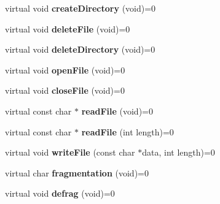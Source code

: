\begin{DoxyCompactItemize}
\mbox{\label{classcore_1_1_i_file_system_a2afdee3dd280f84415d6d0e8cf3c43b9}} 
virtual void {\bfseries create\+Directory} (void)=0
\item 
\mbox{\label{classcore_1_1_i_file_system_acbf35289019edc01a4ca8705e7894ec0}} 
virtual void {\bfseries delete\+File} (void)=0
\item 
\mbox{\label{classcore_1_1_i_file_system_a2aa404fe7bd033745a7e8a84a6f59e21}} 
virtual void {\bfseries delete\+Directory} (void)=0
\item 
\mbox{\label{classcore_1_1_i_file_system_a79903fcc3d8c3e3cb42eebed7dd0b0f0}} 
virtual void {\bfseries open\+File} (void)=0
\item 
\mbox{\label{classcore_1_1_i_file_system_a85d426cd90b6f6bb437d64cf17303226}} 
virtual void {\bfseries close\+File} (void)=0
\item 
\mbox{\label{classcore_1_1_i_file_system_a2f3e927026b148bbefd9d44f3e1dfaef}} 
virtual const char $\ast$ {\bfseries read\+File} (void)=0
\item 
\mbox{\label{classcore_1_1_i_file_system_adbcc31a9db94f4787620d326bc920d60}} 
virtual const char $\ast$ {\bfseries read\+File} (int length)=0
\item 
\mbox{\label{classcore_1_1_i_file_system_ae1108a72181c1c304426e90ceda31d25}} 
virtual void {\bfseries write\+File} (const char $\ast$data, int length)=0
\item 
\mbox{\label{classcore_1_1_i_file_system_ab55a79b54bc802aea7a013cb8c8914e8}} 
virtual char {\bfseries fragmentation} (void)=0
\item 
\mbox{\label{classcore_1_1_i_file_system_a6938f746c7a5f520884e746543d00658}} 
virtual void {\bfseries defrag} (void)=0
\item 
\mbox{\label{classcore_1_1_i_file_system_ac2a36a24f58595213d43df9d7935a390}} 

\end{DoxyCompactItemize}
